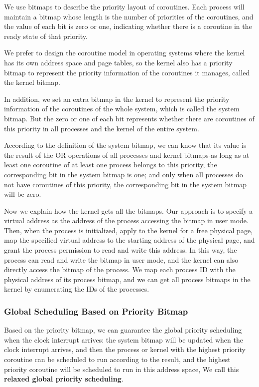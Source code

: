 \documentclass[conference]{IEEEtran}
\begin{document}
We use bitmaps to describe the priority layout of coroutines. Each process will maintain a bitmap whose length is the number of priorities of the coroutines, and the value of each bit is zero or one, indicating whether there is a coroutine in the ready state  of that priority. 

We prefer to design the coroutine model in operating systems where the kernel has its own address space and page tables, so the kernel also has a priority bitmap to represent the priority information of the coroutines it manages, called the kernel bitmap.

In addition, we set an extra bitmap in the kernel to represent the priority information of the coroutines of the whole system, which is called the system bitmap. But the zero or one of each bit represents whether there are coroutines of this priority in all processes and the kernel of the entire system.

According to the definition of the system bitmap, we can know that its value is the result of the OR operations of all processes and kernel bitmaps-as long as at least one coroutine of at least one process belongs to this priority, the corresponding bit in the system bitmap is one; and only when all processes do not have coroutines of this priority, the corresponding bit in the system bitmap will be zero.

Now we explain how the kernel gets all the bitmaps. Our approach is to specify a virtual address as the address of the process accessing the bitmap in user mode. Then, when the process is initialized, apply to the kernel for a free physical page, map the specified virtual address to the starting address of the physical page, and grant the process permission to read and write this address. In this way, the process can read and write the bitmap in user mode, and the kernel can also directly access the bitmap of the process. We map each process ID with the physical address of its process bitmap, and we can get all process bitmaps in the kernel by enumerating the IDs of the processes.

\subsubsection{Global Scheduling Based on Priority Bitmap}

Based on the priority bitmap, we can guarantee the global priority scheduling when the clock interrupt arrives: the system bitmap will be updated when the clock interrupt arrives, and then the process or kernel with the highest priority coroutine can be scheduled to run according to the result, and the highest priority coroutine will be scheduled to run in this address space, We call this \textbf{relaxed global priority scheduling}.
\end{document}
